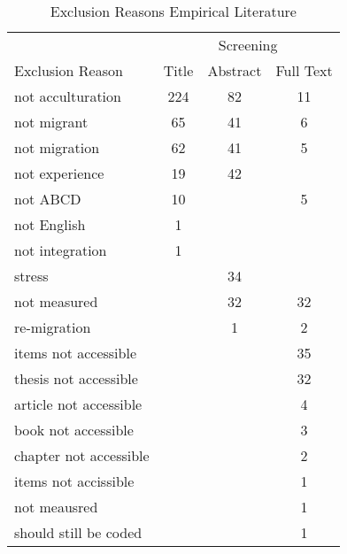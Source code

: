 \begin{table}
\begin{minipage}[t][\textheight][t]{\textwidth}

\caption{\label{tab:EmpiricalExclusion}Exclusion Reasons Empirical Literature}
\begin{tabular}[t]{lccc}
\toprule
\multicolumn{1}{c}{ } & \multicolumn{3}{c}{Screening} \\
\cmidrule(l{3pt}r{3pt}){2-4}
Exclusion Reason & Title & Abstract & Full Text\\
\midrule
not acculturation & 224 & 82 & 11\\
not migrant & 65 & 41 & 6\\
not migration & 62 & 41 & 5\\
not experience & 19 & 42 & \\
not ABCD & 10 &  & 5\\
not English & 1 &  & \\
not integration & 1 &  & \\
stress &  & 34 & \\
not measured &  & 32 & 32\\
re-migration &  & 1 & 2\\
items not accessible &  &  & 35\\
thesis not accessible &  &  & 32\\
article not accessible &  &  & 4\\
book not accessible &  &  & 3\\
chapter not accessible &  &  & 2\\
items not accissible &  &  & 1\\
not meausred &  &  & 1\\
should still be coded &  &  & 1\\
\bottomrule
\end{tabular}
\end{minipage}
\end{table}
